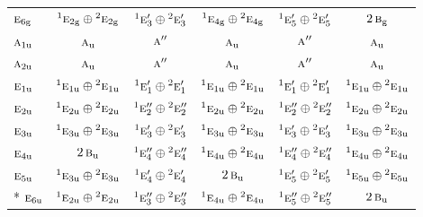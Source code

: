\documentclass[10pt,a4paper]{article}
\numberwithin{equation}{section}
\newcommand{\irr}[1]{\text{\normalfont\scshape #1}}
\newcommand{\conjpair}[1]{{}^{#1}}
\newcommand{\ptag}[1]{\mathrm{#1}}
\begin{document}
{\begin{longtable}{@{}lccccc@{}}
$\irr{e}_{6\ptag{g}}$ & $\conjpair{1}\irr{e}_{2\ptag{g}}\oplus \conjpair{2}\irr{e}_{2\ptag{g}}$ & $\conjpair{1}\irr{e}_{3}'\oplus \conjpair{2}\irr{e}_{3}'$ & $\conjpair{1}\irr{e}_{4\ptag{g}}\oplus \conjpair{2}\irr{e}_{4\ptag{g}}$ & $\conjpair{1}\irr{e}_{5}'\oplus \conjpair{2}\irr{e}_{5}'$ & $2\,\irr{b}_{\ptag{g}}$\\
$\irr{a}_{1\ptag{u}}$ & $\irr{a}_{\ptag{u}}$ & $\irr{a}''$ & $\irr{a}_{\ptag{u}}$ & $\irr{a}''$ & $\irr{a}_{\ptag{u}}$\\
$\irr{a}_{2\ptag{u}}$ & $\irr{a}_{\ptag{u}}$ & $\irr{a}''$ & $\irr{a}_{\ptag{u}}$ & $\irr{a}''$ & $\irr{a}_{\ptag{u}}$\\
$\irr{e}_{1\ptag{u}}$ & $\conjpair{1}\irr{e}_{1\ptag{u}}\oplus \conjpair{2}\irr{e}_{1\ptag{u}}$ & $\conjpair{1}\irr{e}_{1}'\oplus \conjpair{2}\irr{e}_{1}'$ & $\conjpair{1}\irr{e}_{1\ptag{u}}\oplus \conjpair{2}\irr{e}_{1\ptag{u}}$ & $\conjpair{1}\irr{e}_{1}'\oplus \conjpair{2}\irr{e}_{1}'$ & $\conjpair{1}\irr{e}_{1\ptag{u}}\oplus \conjpair{2}\irr{e}_{1\ptag{u}}$\\
$\irr{e}_{2\ptag{u}}$ & $\conjpair{1}\irr{e}_{2\ptag{u}}\oplus \conjpair{2}\irr{e}_{2\ptag{u}}$ & $\conjpair{1}\irr{e}_{2}''\oplus \conjpair{2}\irr{e}_{2}''$ & $\conjpair{1}\irr{e}_{2\ptag{u}}\oplus \conjpair{2}\irr{e}_{2\ptag{u}}$ & $\conjpair{1}\irr{e}_{2}''\oplus \conjpair{2}\irr{e}_{2}''$ & $\conjpair{1}\irr{e}_{2\ptag{u}}\oplus \conjpair{2}\irr{e}_{2\ptag{u}}$\\
$\irr{e}_{3\ptag{u}}$ & $\conjpair{1}\irr{e}_{3\ptag{u}}\oplus \conjpair{2}\irr{e}_{3\ptag{u}}$ & $\conjpair{1}\irr{e}_{3}'\oplus \conjpair{2}\irr{e}_{3}'$ & $\conjpair{1}\irr{e}_{3\ptag{u}}\oplus \conjpair{2}\irr{e}_{3\ptag{u}}$ & $\conjpair{1}\irr{e}_{3}'\oplus \conjpair{2}\irr{e}_{3}'$ & $\conjpair{1}\irr{e}_{3\ptag{u}}\oplus \conjpair{2}\irr{e}_{3\ptag{u}}$\\
$\irr{e}_{4\ptag{u}}$ & $2\,\irr{b}_{\ptag{u}}$ & $\conjpair{1}\irr{e}_{4}''\oplus \conjpair{2}\irr{e}_{4}''$ & $\conjpair{1}\irr{e}_{4\ptag{u}}\oplus \conjpair{2}\irr{e}_{4\ptag{u}}$ & $\conjpair{1}\irr{e}_{4}''\oplus \conjpair{2}\irr{e}_{4}''$ & $\conjpair{1}\irr{e}_{4\ptag{u}}\oplus \conjpair{2}\irr{e}_{4\ptag{u}}$\\
$\irr{e}_{5\ptag{u}}$ & $\conjpair{1}\irr{e}_{3\ptag{u}}\oplus \conjpair{2}\irr{e}_{3\ptag{u}}$ & $\conjpair{1}\irr{e}_{4}'\oplus \conjpair{2}\irr{e}_{4}'$ & $2\,\irr{b}_{\ptag{u}}$ & $\conjpair{1}\irr{e}_{5}'\oplus \conjpair{2}\irr{e}_{5}'$ & $\conjpair{1}\irr{e}_{5\ptag{u}}\oplus \conjpair{2}\irr{e}_{5\ptag{u}}$\\*
$\irr{e}_{6\ptag{u}}$ & $\conjpair{1}\irr{e}_{2\ptag{u}}\oplus \conjpair{2}\irr{e}_{2\ptag{u}}$ & $\conjpair{1}\irr{e}_{3}''\oplus \conjpair{2}\irr{e}_{3}''$ & $\conjpair{1}\irr{e}_{4\ptag{u}}\oplus \conjpair{2}\irr{e}_{4\ptag{u}}$ & $\conjpair{1}\irr{e}_{5}''\oplus \conjpair{2}\irr{e}_{5}''$ & $2\,\irr{b}_{\ptag{u}}$\\
\bottomrule\end{longtable}}
\end{document}
